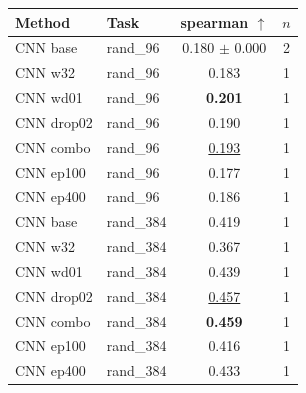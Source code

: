 \begin{tabular}{llcc}
\toprule
Method & Task & spearman $\uparrow$ & $n$ \\
\midrule
CNN base & rand\_96 & 0.180 $\pm$ 0.000 & 2 \\
CNN w32 & rand\_96 & 0.183 & 1 \\
CNN wd01 & rand\_96 & \textbf{0.201} & 1 \\
CNN drop02 & rand\_96 & 0.190 & 1 \\
CNN combo & rand\_96 & \underline{0.193} & 1 \\
CNN ep100 & rand\_96 & 0.177 & 1 \\
CNN ep400 & rand\_96 & 0.186 & 1 \\
\midrule
CNN base & rand\_384 & 0.419 & 1 \\
CNN w32 & rand\_384 & 0.367 & 1 \\
CNN wd01 & rand\_384 & 0.439 & 1 \\
CNN drop02 & rand\_384 & \underline{0.457} & 1 \\
CNN combo & rand\_384 & \textbf{0.459} & 1 \\
CNN ep100 & rand\_384 & 0.416 & 1 \\
CNN ep400 & rand\_384 & 0.433 & 1 \\
\bottomrule
\end{tabular}

